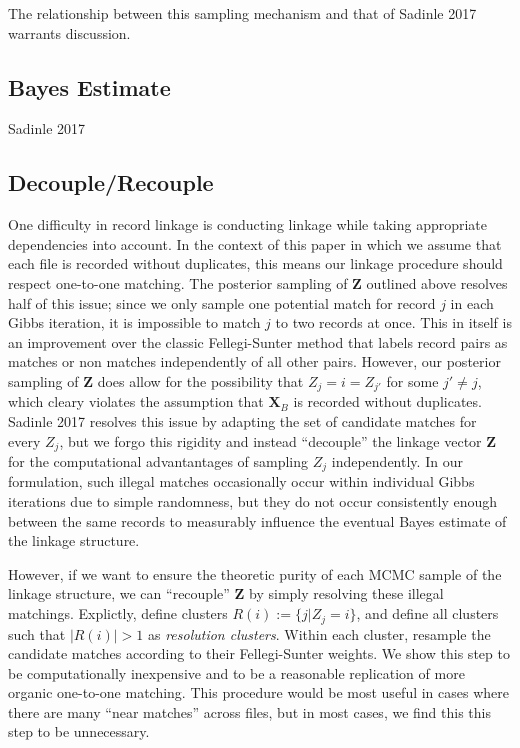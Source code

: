 \documentclass[
  12pt,
]{article}
\begin{document}
The relationship between this sampling mechanism and that of Sadinle
2017 warrants discussion.

\hypertarget{bayes-estimate}{%
\subsection{Bayes Estimate}\label{bayes-estimate}}

Sadinle 2017

\hypertarget{decouplerecouple}{%
\subsection{Decouple/Recouple}\label{decouplerecouple}}

One difficulty in record linkage is conducting linkage while taking
appropriate dependencies into account. In the context of this paper in
which we assume that each file is recorded without duplicates, this
means our linkage procedure should respect one-to-one matching. The
posterior sampling of \(\mathbf{Z}\) outlined above resolves half of
this issue; since we only sample one potential match for record \(j\) in
each Gibbs iteration, it is impossible to match \(j\) to two records at
once. This in itself is an improvement over the classic Fellegi-Sunter
method that labels record pairs as matches or non matches independently
of all other pairs. However, our posterior sampling of \(\mathbf{Z}\)
does allow for the possibility that \(Z_j = i = Z_{j'}\) for some
\(j' \neq j\), which cleary violates the assumption that
\(\mathbf{X}_B\) is recorded without duplicates. Sadinle 2017 resolves
this issue by adapting the set of candidate matches for every \(Z_j\),
but we forgo this rigidity and instead ``decouple'' the linkage vector
\(\mathbf{Z}\) for the computational advantantages of sampling \(Z_j\)
independently. In our formulation, such illegal matches occasionally
occur within individual Gibbs iterations due to simple randomness, but
they do not occur consistently enough between the same records to
measurably influence the eventual Bayes estimate of the linkage
structure.

However, if we want to ensure the theoretic purity of each MCMC sample
of the linkage structure, we can ``recouple'' \(\mathbf{Z}\) by simply
resolving these illegal matchings. Explictly, define clusters
\(R(i) := \{j | Z_j = i\}\), and define all clusters such that
\(|R(i)| > 1\) as \emph{resolution clusters}. Within each cluster,
resample the candidate matches according to their Fellegi-Sunter
weights. We show this step to be computationally inexpensive and to be a
reasonable replication of more organic one-to-one matching. This
procedure would be most useful in cases where there are many ``near
matches'' across files, but in most cases, we find this this step to be
unnecessary.
\end{document}
